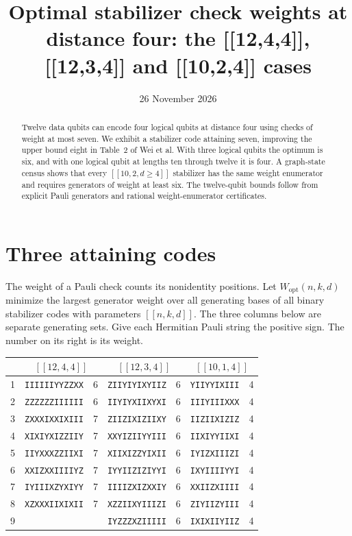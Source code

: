 \documentclass[11pt]{article}
\title{Optimal stabilizer check weights at distance four: the [[12,4,4]], [[12,3,4]] and [[10,2,4]] cases}
\date{26 November 2026}
\newcommand{\W}{W_{\mathrm{opt}}}
\begin{document}
\maketitle
\begin{abstract}
Twelve data qubits can encode four logical qubits at distance four using checks of weight at most seven. We exhibit a stabilizer code attaining seven, improving the upper bound eight in Table~2 of Wei et al. With three logical qubits the optimum is six, and with one logical qubit at lengths ten through twelve it is four. A graph-state census shows that every $[[10,2,d\ge4]]$ stabilizer has the same weight enumerator and requires generators of weight at least six. The twelve-qubit bounds follow from explicit Pauli generators and rational weight-enumerator certificates.
\end{abstract}
\section*{Three attaining codes}
The weight of a Pauli check counts its nonidentity positions. Let $\W(n,k,d)$ minimize the largest generator weight over all generating bases of all binary stabilizer codes with parameters $[[n,k,d]]$. The three columns below are separate generating sets. Give each Hermitian Pauli string the positive sign. The number on its right is its weight.
\begin{center}
\begin{tabular}{r@{\quad}lr@{\qquad}lr@{\qquad}lr}
\toprule
& \multicolumn{2}{c}{$[[12,4,4]]$} & \multicolumn{2}{c}{$[[12,3,4]]$} & \multicolumn{2}{c}{$[[10,1,4]]$} \\\midrule
1 & \texttt{IIIIIIYYZZXX} & 6 & \texttt{ZIIYIYIXYIIZ} & 6 & \texttt{YIIYYIXIII} & 4\\
2 & \texttt{ZZZZZZIIIIII} & 6 & \texttt{IIYIYXIIXYXI} & 6 & \texttt{IIIYIIIXXX} & 4\\
3 & \texttt{ZXXXIXXIXIII} & 7 & \texttt{ZIIZIXIZIIXY} & 6 & \texttt{IIZIIXIZIZ} & 4\\
4 & \texttt{XIXIYXIZZIIY} & 7 & \texttt{XXYIZIIYYIII} & 6 & \texttt{IIXIYYIIXI} & 4\\
5 & \texttt{IIYXXXZZIIXI} & 7 & \texttt{XIIXIZZYIXII} & 6 & \texttt{IYIZXIIIZI} & 4\\
6 & \texttt{XXIZXXIIIIYZ} & 7 & \texttt{IYYIIZIZIYYI} & 6 & \texttt{IXYIIIIYYI} & 4\\
7 & \texttt{IYIIIXZYXIYY} & 7 & \texttt{IIIIZXIZXXIY} & 6 & \texttt{XXIIZXIIII} & 4\\
8 & \texttt{XZXXXIIXIXII} & 7 & \texttt{XZZIIXYIIIZI} & 6 & \texttt{ZIYIIZYIII} & 4\\
9 &  &  & \texttt{IYZZZXZIIIII} & 6 & \texttt{IXIXIIYIIZ} & 4\\
\bottomrule\end{tabular}
\end{center}
\end{document}
